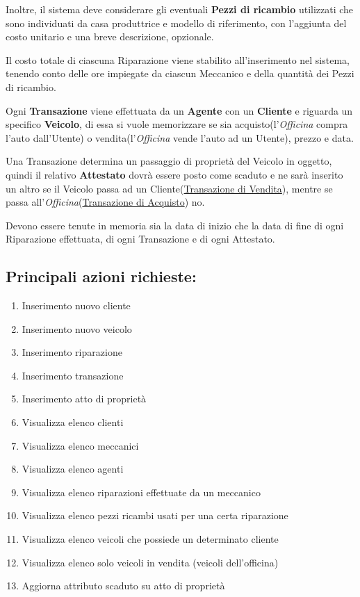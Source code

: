 \documentclass[a4paper,12pt]{report}
\begin{document}
Inoltre, il sistema deve considerare gli eventuali \textbf{Pezzi di ricambio} utilizzati che sono individuati da 
%
casa produttrice e modello di riferimento, con l'aggiunta del costo unitario e una breve descrizione, opzionale.

Il costo totale di ciascuna Riparazione viene stabilito all'inserimento nel sistema, tenendo conto delle ore 
%
impiegate da ciascun Meccanico e della quantità dei Pezzi di ricambio.

Ogni \textbf{Transazione} viene effettuata da un \textbf{Agente} con un \textbf{Cliente} e riguarda un specifico \textbf{Veicolo},
%
di essa si vuole memorizzare se sia acquisto(l'\textit{Officina} compra l'auto dall'Utente) o vendita(l'\textit{Officina} 
% 
vende l'auto ad un Utente), prezzo e data. 

Una Transazione determina un passaggio di proprietà del Veicolo in oggetto, quindi il relativo \textbf{Attestato} 
%
dovrà essere posto come scaduto e ne sarà inserito un altro se il Veicolo passa ad un Cliente(\underline{Transazione di Vendita}),
%
mentre se passa all'\textit{Officina}(\underline{Transazione di Acquisto}) no.

Devono essere tenute in memoria sia la data di inizio che la data di fine di ogni Riparazione effettuata, di ogni Transazione e di 
%
ogni Attestato.

\subsection*{Principali azioni richieste:}
\begin{enumerate}
	\item Inserimento nuovo cliente
	\item Inserimento nuovo veicolo
	\item Inserimento riparazione
	\item Inserimento transazione
	\item Inserimento atto di proprietà
	\item Visualizza elenco clienti
	\item Visualizza elenco meccanici
	\item Visualizza elenco agenti
	\item Visualizza elenco riparazioni effettuate da un meccanico
	\item Visualizza elenco pezzi ricambi usati per una certa riparazione
	\item Visualizza elenco veicoli che possiede un determinato cliente
	\item Visualizza elenco solo veicoli in vendita (veicoli dell'officina)
	\item Aggiorna attributo scaduto su atto di proprietà
\end{enumerate}
\end{document}
